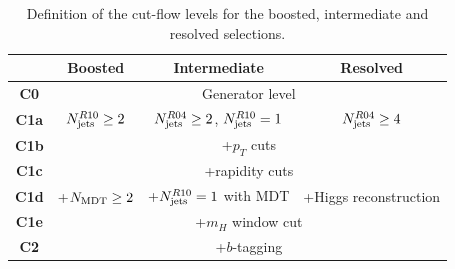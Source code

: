 \begin{table}[t]
  \centering
  \begin{tabular}{|c|c|c|c|}
\hline
&  Boosted  &   Intermediate &  Resolved  \\
\hline
\hline
{\bf C0} &  \multicolumn{3}{c|}{Generator level} \\
\hline
{\bf C1a} & $N_{\rm jets}^{R10}\ge 2$ & $N_{\rm jets}^{R04}\ge 2$, $N_{\rm jets}^{R10}=1$  &
$N_{\rm jets}^{R04}\ge 4$ \\
\hline
{\bf  C1b} & \multicolumn{3}{c|}{+$p_T$ cuts} \\
{\bf C1c} & \multicolumn{3}{c|}{+rapidity cuts}\\
\hline
 {\bf C1d} & +$N_{\rm MDT}\ge 2$ & +$N_{\rm jets}^{R10}=1$ with MDT  &
 +Higgs reconstruction \\
 \hline
{\bf C1e} & \multicolumn{3}{c|}{ +$m_H$ window cut} \\
\hline
{\bf C2} & \multicolumn{3}{c|}{+$b$-tagging}    \\
\hline
  \end{tabular}
  \caption{\small Definition of the cut-flow levels for the boosted, intermediate
    and resolved selections.
      \label{tab:cutflowdetails}
  }
\end{table}


